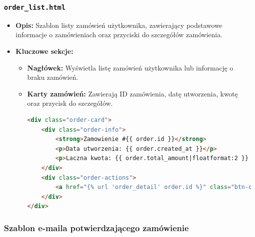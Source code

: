 \documentclass[12pt,a4paper,oneside]{article}
\theoremstyle{definition}
\numberwithin{equation}{section}
\begin{document}
\subsubsection*{\texttt{order\_list.html}}
\label{sec:order_list_template}

\begin{itemize}
    \item \textbf{Opis:} 
    Szablon listy zamówień użytkownika, zawierający podstawowe informacje o zamówieniach oraz przyciski do szczegółów zamówienia.
    \item \textbf{Kluczowe sekcje:}
    \begin{itemize}
        \item \textbf{Nagłówek:} Wyświetla listę zamówień użytkownika lub informację o braku zamówień.
        \item \textbf{Karty zamówień:} Zawierają ID zamówienia, datę utworzenia, kwotę oraz przycisk do szczegółów.
        \begin{lstlisting}[language=HTML]
<div class="order-card">
    <div class="order-info">
        <strong>Zamowienie #{{ order.id }}</strong>
        <p>Data utworzenia: {{ order.created_at }}</p>
        <p>Laczna kwota: {{ order.total_amount|floatformat:2 }} zl</p>
    </div>
    <div class="order-actions">
        <a href="{% url 'order_detail' order.id %}" class="btn-order-details">Szczegoly</a>
    </div>
</div>
        \end{lstlisting}
    \end{itemize}
\end{itemize}

\subsubsection*{Szablon e-maila potwierdzającego zamówienie}
\end{document}
